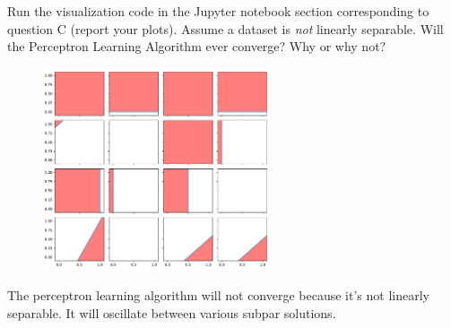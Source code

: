 \begin{problem}[2]
  Run the visualization code in the Jupyter notebook section corresponding to question C (report your plots). Assume a dataset is \emph{not} linearly separable. Will the Perceptron Learning Algorithm ever converge? Why or why not?
\end{problem}
\begin{solution}
  \begin{figure}[H]
    \centering
    \includegraphics[width=0.6\textwidth]{images/fig5.pdf}
  \end{figure}
  The perceptron learning algorithm will not converge because it's not linearly separable. It will oscillate between various subpar solutions.
\end{solution}

